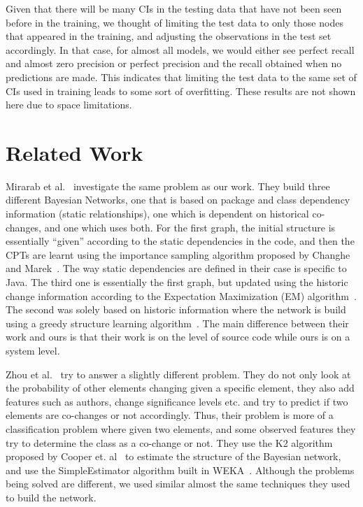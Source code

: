 \documentclass[10pt,twocolumn,letterpaper]{article}
\begin{document}
Given that there will be many CIs in the testing data that have not been seen before in the training, we thought of limiting the test data to only
those nodes that appeared in the training, and adjusting the observations in the test set
accordingly. In that case, for almost all models, we would either see perfect recall and almost zero precision or perfect precision and the recall obtained
when no predictions are made. This indicates that limiting the test data to the same set of CIs used in training leads to some sort
of overfitting. These results are not shown here due to space limitations.


\section{Related Work}
\label{rel-work}

Mirarab et al.~\cite{mirarab2007} investigate the same problem as our work. They build three
different Bayesian Networks, one that is based on package and class dependency information (static relationships), one which is dependent on historical
co-changes, and one which uses both. For the first graph, the initial structure is essentially ``given'' according to the static dependencies in the code, and
then the CPTs
are learnt using the importance sampling algorithm proposed by Changhe and Marek~\cite{yuan2003importance}. The way static dependencies are defined in their
case is specific to Java. The third one is essentially the first graph, but updated using the historic change information according to the Expectation
Maximization (EM) algorithm~\cite{dempster1977maximum}. The second was solely based on historic information where the network is build using a greedy structure
 learning algorithm~\cite{friedman1996learning}. The main difference between their work and ours is that their work is on the level of source
code while ours is on a system level.

Zhou et al.~\cite{zhou2008} try to answer a slightly different problem. They do not only look at the probability of other elements changing given a specific
element, they also add features such as authors, change significance levels etc. and try to predict if two elements are co-changes or not accordingly. Thus,
their problem is more of a classification problem where given two elements, and some observed features they try to determine the class as a co-change or not.
They use the K2 algorithm proposed by Cooper et. al~\cite{cooper1992bayesian} to estimate the structure of the Bayesian network, and use the SimpleEstimator
algorithm built in WEKA~\cite{witten2005data}. Although the problems being solved are different, we used similar almost the same techniques they used to build
the network.
\end{document}
